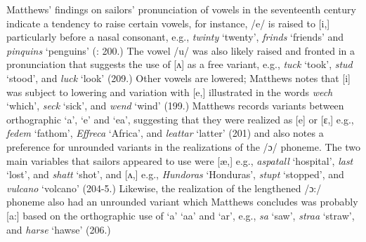 Matthews’ findings on sailors’ pronunciation of vowels in the seventeenth century indicate a tendency to raise certain vowels, for instance, /e/ is raised to [i,] particularly before a nasal consonant, e.g., \textit{twinty} ‘twenty’, \textit{frinds} ‘friends’ and \textit{pinquins} ‘penguins’ (\citealt{Matthews1935}: 200.) The vowel /u/ was also likely raised and fronted in a pronunciation that suggests the use of [ʌ] as a free variant, e.g., \textit{tuck} ‘took’, \textit{stud} ‘stood’, and \textit{luck} ‘look’ (209.) Other vowels are lowered; Matthews notes that [i] was subject to lowering and variation with [e,] illustrated in the words \textit{wech} ‘which’, \textit{seck} ‘sick’, and \textit{wend} ‘wind’ (199.) Matthews records variants between orthographic ‘a’, ‘e’ and ‘ea’, suggesting that they were realized as [e] or [ɛ,] e.g., \textit{fedem} ‘fathom’, \textit{Effreca} ‘Africa’, and \textit{leattar} ‘latter’ (201) and also notes a preference for unrounded variants in the realizations of the /ɔ/ phoneme. The two main variables that sailors appeared to use were [æ,] e.g., \textit{aspatall} ‘hospital’, \textit{last} ‘lost’, and \textit{shatt} ‘shot’, and [ʌ,] e.g., \textit{Hundoras} ‘Honduras’, \textit{stupt} ‘stopped’, and \textit{vulcano} ‘volcano’ (204-5.) Likewise, the realization of the lengthened /ɔ:/ phoneme also had an unrounded variant which Matthews concludes was probably [a:] based on the orthographic use of ‘a’ ‘aa’ and ‘ar’, e.g., \textit{sa} ‘saw’, \textit{straa} ‘straw’, and \textit{harse} ‘hawse’ (206.) 

